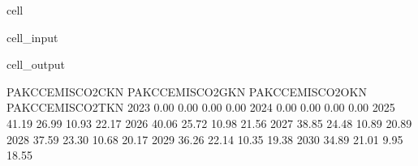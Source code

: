 \documentclass[letterpaper,10pt,english]{jupyterBook}
\begin{document}
\begin{sphinxuseclass}{cell}\begin{sphinxVerbatimInput}

\begin{sphinxuseclass}{cell_input}
\begin{sphinxVerbatim}[commandchars=\\\{\}]
 
    \PYG{p}{[}\PYG{p}{]}
\end{sphinxVerbatim}

\end{sphinxuseclass}\end{sphinxVerbatimInput}
\begin{sphinxVerbatimOutput}

\begin{sphinxuseclass}{cell_output}
\begin{sphinxVerbatim}[commandchars=\\\{\}]
      PAKCCEMISCO2CKN  PAKCCEMISCO2GKN  PAKCCEMISCO2OKN  PAKCCEMISCO2TKN
2023             0.00             0.00             0.00             0.00
2024             0.00             0.00             0.00             0.00
2025           \PYGZhy{}41.19           \PYGZhy{}26.99           \PYGZhy{}10.93           \PYGZhy{}22.17
2026           \PYGZhy{}40.06           \PYGZhy{}25.72           \PYGZhy{}10.98           \PYGZhy{}21.56
2027           \PYGZhy{}38.85           \PYGZhy{}24.48           \PYGZhy{}10.89           \PYGZhy{}20.89
2028           \PYGZhy{}37.59           \PYGZhy{}23.30           \PYGZhy{}10.68           \PYGZhy{}20.17
2029           \PYGZhy{}36.26           \PYGZhy{}22.14           \PYGZhy{}10.35           \PYGZhy{}19.38
2030           \PYGZhy{}34.89           \PYGZhy{}21.01            \PYGZhy{}9.95           \PYGZhy{}18.55
\end{sphinxVerbatim}

\end{sphinxuseclass}\end{sphinxVerbatimOutput}

\end{sphinxuseclass}
\end{document}
